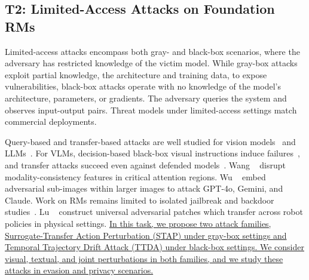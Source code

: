 \documentclass[11pt,letterpaper]{article}
\begin{document}


\subsection{T2: Limited-Access Attacks on Foundation RMs} \label{sec:t2}

Limited-access attacks encompass both gray- and black-box scenarios, where the adversary has restricted knowledge of the victim model.
While gray-box attacks exploit partial knowledge, \eg the architecture and training data, to expose vulnerabilities, black-box attacks operate with no knowledge of the model's architecture, parameters, or gradients. The adversary queries the system and observes input-output pairs. Threat models under limited-access settings match commercial deployments. 




 Query-based and transfer-based attacks are well studied for vision models~\cite{guo2019simple,hallyburton2022security,abdukhamidov2022black,juraev2024attack,abdukhamidov2023microbial} and LLMs~\cite{li2023deepinception,yao2024fuzzllm,ding-etal-2024-wolf,wei2023jailbreak,deng2024pandora}. For VLMs, decision-based black-box visual instructions induce failures~\cite{zhang2024avibench}, and transfer attacks succeed even against defended models~\cite{dong2023robust}. 
Wang \etal~\cite{wang2024transferable} disrupt modality-consistency features in critical attention regions. 
Wu \etal~\cite{wu2024adversarial} embed adversarial sub-images within larger images to attack GPT-4o, Gemini, and Claude. 
Work on RMs remains limited to isolated jailbreak and backdoor studies~\cite{badvla,advvla}. Lu \etal~\cite{lu2026whenrobots} construct universal adversarial patches which transfer across robot policies in physical settings. 
\ul{In this task, we propose 
two attack families, Surrogate-Transfer Action Perturbation (STAP) under gray-box settings and  Temporal Trajectory Drift Attack (TTDA) under black-box settings. We consider visual, textual, and joint perturbations in both families, and we study these attacks in evasion and privacy scenarios.}
\end{document}

